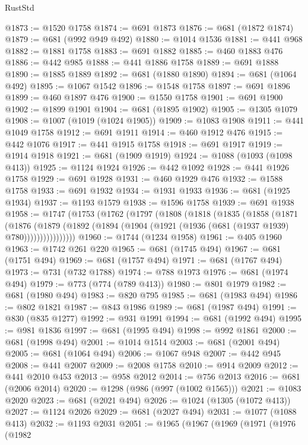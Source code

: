 \begin{lexlean}{RustStd}
\begin{coremodule}
@1873 := @1520 @1758
@1874 := @691 @1873
@1876 := @681 (@1872 @1874)
@1879 := @681 (@992 @949 @492)
@1880 := @1014 @1536
@1881 := @441 @968
@1882 := @1881 @1758
@1883 := @691 @1882
@1885 := @460 @1883 @476
@1886 := @442 @985
@1888 := @441 @1886 @1758
@1889 := @691 @1888
@1890 := @1885 @1889
@1892 := @681 (@1880 @1890)
@1894 := @681 (@1064 @492)
@1895 := @1067 @1542
@1896 := @1548 @1758
@1897 := @691 @1896
@1899 := @460 @1897 @476
@1900 := @1550 @1758
@1901 := @691 @1900
@1902 := @1899 @1901
@1904 := @681 (@1895 @1902)
@1905 := @1305 @1079
@1908 := @1007 (@1019 (@1024 @1905))
@1909 := @1083 @1908
@1911 := @441 @1049 @1758
@1912 := @691 @1911
@1914 := @460 @1912 @476
@1915 := @442 @1076
@1917 := @441 @1915 @1758
@1918 := @691 @1917
@1919 := @1914 @1918
@1921 := @681 (@1909 @1919)
@1924 := @1088 (@1093 (@1098 @413))
@1925 := @1124 @1924
@1926 := @442 @1092
@1928 := @441 @1926 @1758
@1929 := @691 @1928
@1931 := @460 @1929 @476
@1932 := @1588 @1758
@1933 := @691 @1932
@1934 := @1931 @1933
@1936 := @681 (@1925 @1934)
@1937 := @1193 @1579
@1938 := @1596 @1758
@1939 := @691 @1938
@1958 := @1747
    (@1753
      (@1762
        (@1797
          (@1808
            (@1818
              (@1835
                (@1858
                  (@1871
                    (@1876
                      (@1879
                        (@1892 (@1894 (@1904 (@1921 (@1936 (@681 (@1937 @1939) @780))))))))))))))))
@1960 := @1744 (@1234 @1958)
@1961 := @405 @1960
@1963 := @1742 @261 @220
@1965 := @681 (@1745 @494)
@1967 := @681 (@1751 @494)
@1969 := @681 (@1757 @494)
@1971 := @681 (@1767 @494)
@1973 := @731 (@732 @1788)
@1974 := @788 @1973
@1976 := @681 (@1974 @494)
@1979 := @773 (@774 (@789 @413))
@1980 := @801 @1979
@1982 := @681 (@1980 @494)
@1983 := @820 @795
@1985 := @681 (@1983 @494)
@1986 := @802 @1821
@1987 := @843 @1986
@1989 := @681 (@1987 @494)
@1991 := @830 (@835 @1277)
@1992 := @931 @1991
@1994 := @681 (@1992 @494)
@1995 := @981 @1836
@1997 := @681 (@1995 @494)
@1998 := @992 @1861
@2000 := @681 (@1998 @494)
@2001 := @1014 @1514
@2003 := @681 (@2001 @494)
@2005 := @681 (@1064 @494)
@2006 := @1067 @948
@2007 := @442 @945
@2008 := @441 @2007
@2009 := @2008 @1758
@2010 := @914 @2009
@2012 := @441 @2010 @453
@2013 := @958 @2012
@2014 := @756 @2013
@2016 := @681 (@2006 @2014)
@2020 := @1298 (@986 (@997 (@1002 @1565)))
@2021 := @1083 @2020
@2023 := @681 (@2021 @494)
@2026 := @1024 (@1305 (@1072 @413))
@2027 := @1124 @2026
@2029 := @681 (@2027 @494)
@2031 := @1077 (@1088 @413)
@2032 := @1193 @2031
@2051 := @1965
    (@1967
      (@1969
        (@1971
          (@1976
            (@1982

\end{coremodule}
\end{lexlean}
